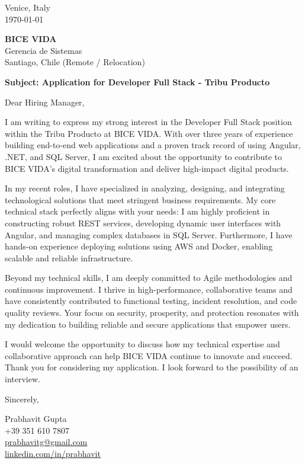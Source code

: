 \documentclass[11pt,a4paper]{article}
\begin{document}
\thispagestyle{empty}

\begin{flushright}
Venice, Italy \\
\today
\end{flushright}

\vspace{5mm}
\noindent
\textbf{BICE VIDA} \\
Gerencia de Sistemas \\
Santiago, Chile (Remote / Relocation)

\vspace{10mm}
\noindent
\textbf{Subject: Application for Developer Full Stack - Tribu Producto}

\vspace{5mm}
\noindent
Dear Hiring Manager,

\vspace{3mm}
\noindent
I am writing to express my strong interest in the Developer Full Stack position within the Tribu Producto at BICE VIDA. With over three years of experience building end-to-end web applications and a proven track record of using Angular, .NET, and SQL Server, I am excited about the opportunity to contribute to BICE VIDA's digital transformation and deliver high-impact digital products.

\vspace{3mm}
\noindent
In my recent roles, I have specialized in analyzing, designing, and integrating technological solutions that meet stringent business requirements. My core technical stack perfectly aligns with your needs: I am highly proficient in constructing robust REST services, developing dynamic user interfaces with Angular, and managing complex databases in SQL Server. Furthermore, I have hands-on experience deploying solutions using AWS and Docker, enabling scalable and reliable infrastructure.

\vspace{3mm}
\noindent
Beyond my technical skills, I am deeply committed to Agile methodologies and continuous improvement. I thrive in high-performance, collaborative teams and have consistently contributed to functional testing, incident resolution, and code quality reviews. Your focus on security, prosperity, and protection resonates with my dedication to building reliable and secure applications that empower users.

\vspace{3mm}
\noindent
I would welcome the opportunity to discuss how my technical expertise and collaborative approach can help BICE VIDA continue to innovate and succeed. Thank you for considering my application. I look forward to the possibility of an interview.

\vspace{5mm}
\noindent
Sincerely,

\vspace{3mm}
\noindent
Prabhavit Gupta \\
+39 351 610 7807 \\
\href{mailto:prabhavitg@gmail.com}{prabhavitg@gmail.com} \\
\href{https://www.linkedin.com/in/prabhavit/}{linkedin.com/in/prabhavit}
\end{document}
